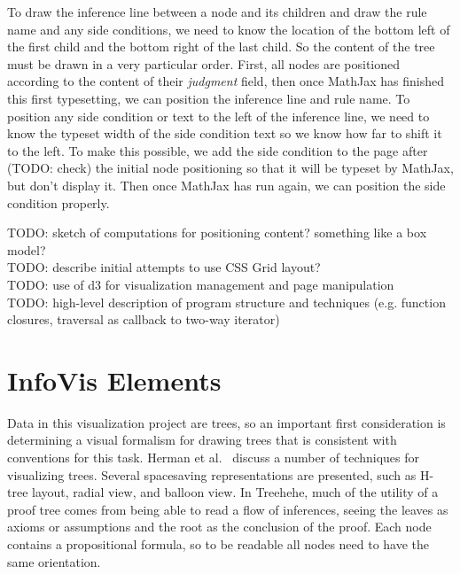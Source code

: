 \documentclass[conference]{IEEEtran}
\newcommand{\projectname}{Treehehe}
\begin{document}
To draw the inference line between a node and its children and draw the rule name and any side conditions, we need to know the location of the bottom left of the first child and the bottom right of the last child. So the content of the tree must be drawn in a very particular order. First, all nodes are positioned according to the content of their \textit{judgment} field, then once MathJax has finished this first typesetting, we can position the inference line and rule name. To position any side condition or text to the left of the inference line, we need to know the typeset width of the side condition text so we know how far to shift it to the left. To make this possible, we add the side condition to the page after (TODO: check) the initial node positioning so that it will be typeset by MathJax, but don't display it. Then once MathJax has run again, we can position the side condition properly.

TODO: sketch of computations for positioning content? something like a box model? \\

TODO: describe initial attempts to use CSS Grid layout? \\

TODO: use of d3 for visualization management and page manipulation \\

TODO: high-level description of program structure and techniques (e.g. function closures, traversal as callback to two-way iterator) \\


\section{InfoVis Elements}
\label{sec:infoviselem}

Data in this visualization project are trees, so an important first consideration is determining a visual formalism for drawing trees that is consistent with conventions for this task. Herman et al.~\cite{graphvis-herman+melancon+marshall} discuss a number of techniques for visualizing trees. Several spacesaving representations are presented, such as H-tree layout, radial view, and balloon view. In \projectname{}, much of the utility of a proof tree comes from being able to read a flow of inferences, seeing the leaves as axioms or assumptions and the root as the conclusion of the proof. Each node contains a propositional formula, so to be readable all nodes need to have the same orientation.
\end{document}
